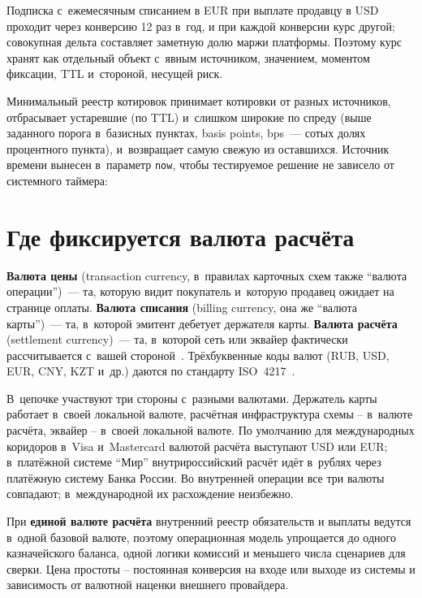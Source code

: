 Подписка с~ежемесячным списанием в EUR при выплате продавцу в USD
проходит через конверсию 12 раз в~год, и при каждой конверсии
курс другой; совокупная дельта составляет заметную
долю маржи платформы. Поэтому курс хранят как
отдельный объект с~явным источником, значением, моментом
фиксации, TTL и~стороной, несущей риск.

Минимальный реестр котировок принимает котировки от разных
источников, отбрасывает устаревшие (по TTL) и~слишком широкие
по спреду (выше заданного порога в~базисных пунктах,
basis points, bps~--- сотых долях процентного пункта),
и~возвращает самую
свежую из оставшихся. Источник времени вынесен в~параметр
\texttt{now}, чтобы тестируемое решение не зависело от системного
таймера:


\section{Где фиксируется валюта расчёта}\label{sec:mc-settlement}

\textbf{Валюта цены} (transaction currency, в~правилах
карточных схем также \enquote{валюта операции})~--- та,
которую видит покупатель и~которую продавец ожидает
на странице оплаты.
\textbf{Валюта списания} (billing currency, она же
\enquote{валюта карты})~--- та,
в~которой эмитент дебетует держателя карты.
\textbf{Валюта расчёта} (settlement currency)~--- та,
в~которой сеть или эквайер фактически рассчитывается с~вашей
стороной~\cite{visa-core-rules,mc-rules}. Трёхбуквенные коды
валют (RUB, USD, EUR, CNY, KZT и~др.) даются по стандарту
ISO~4217~\cite{iso-4217}.

В~цепочке участвуют три стороны с~разными валютами.
Держатель карты работает в~своей локальной валюте, расчётная
инфраструктура схемы -- в~валюте расчёта, эквайер --
в~своей локальной валюте. По умолчанию для международных
коридоров в~Visa и~Mastercard валютой расчёта выступают
USD или EUR; в~платёжной системе
\enquote{Мир} внутрироссийский расчёт идёт в~рублях через
платёжную систему Банка России. Во внутренней операции все три
валюты совпадают; в~международной их расхождение неизбежно.

При \textbf{единой валюте расчёта} внутренний реестр обязательств
и выплаты ведутся в~одной базовой валюте, поэтому операционная
модель упрощается до одного казначейского баланса, одной
логики комиссий и меньшего числа сценариев для сверки. Цена
простоты -- постоянная конверсия на входе или выходе из системы
и зависимость от валютной наценки внешнего провайдера.

